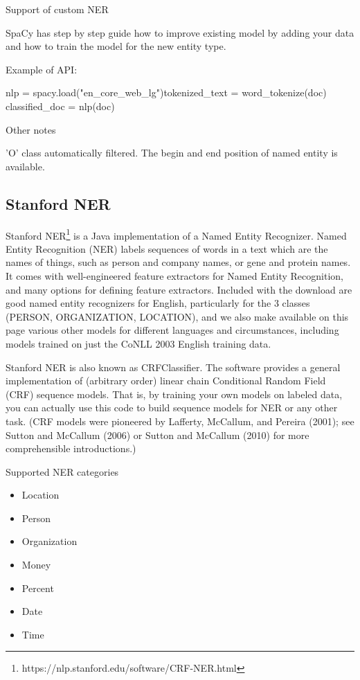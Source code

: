 \documentclass[conference]{IEEEtran}
\begin{document}
Support of custom NER

SpaCy has step by step guide how to improve existing model by adding your data and how to train the model for the new entity type.

Example of API:

\begin{verbatimtab}[4]
nlp = spacy.load("en_core_web_lg")tokenized_text = word_tokenize(doc)
classified_doc = nlp(doc)
\end{verbatimtab}

Other notes

'O' class automatically filtered. The begin and end position of named entity is available.

\subsection{Stanford NER}

Stanford NER\footnote{https://nlp.stanford.edu/software/CRF-NER.html}  is a Java implementation of a Named Entity Recognizer. Named Entity Recognition (NER) labels sequences of words in a text which are the names of things, such as person and company names, or gene and protein names. It comes with well-engineered feature extractors for Named Entity Recognition, and many options for defining feature extractors. Included with the download are good named entity recognizers for English, particularly for the 3 classes (PERSON, ORGANIZATION, LOCATION), and we also make available on this page various other models for different languages and circumstances, including models trained on just the CoNLL 2003 English training data.

Stanford NER is also known as CRFClassifier. The software provides a general implementation of (arbitrary order) linear chain Conditional Random Field (CRF) sequence models. That is, by training your own models on labeled data, you can actually use this code to build sequence models for NER or any other task. (CRF models were pioneered by Lafferty, McCallum, and Pereira (2001); see Sutton and McCallum (2006) or Sutton and McCallum (2010) for more comprehensible introductions.)

Supported NER categories

\begin{itemize}
	\item Location
	\item Person
	\item Organization
	\item Money
	\item Percent
	\item Date
	\item Time
\end{itemize}
\end{document}
